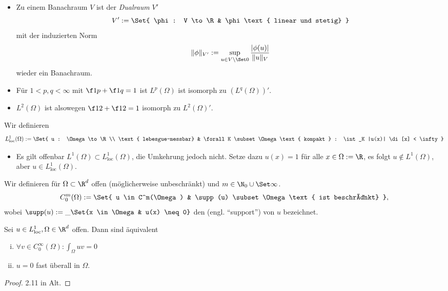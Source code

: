 \begin{df}[$L^p$-Räume]
\begin{note}
\begin{itemize}
			\item
				Zu einem Banachraum $V$ ist der \emph{Dualraum} $V'$
				\[
					V' := \Set{ \phi: V \to \R & \phi \text{ linear und stetig} }
				\]
				mit der induzierten Norm
				\[
					\|\phi\|_{V'} := \sup_{u\in V\setminus \Set 0} \frac{|\phi(u)|}{\|u\|_V}
				\]
				wieder ein Banachraum.
			\item
				Für $1 < p,q < \infty$ mit $\f 1p + \f 1q = 1$ ist $L^p(\Omega)$ ist isomorph zu $(L^q(\Omega))'$.
			\item
				$L^2(\Omega)$ ist alsowegen $\f 12 + \f 12 = 1$ isomorph zu $L^2(\Omega)'$.
		\end{itemize}
	\end{note}
\end{df}

\begin{df} \label{1.5}
	Wir definieren
	\[
		L^1_{\text{loc}}(\Omega) :=
		\Set{ u : \Omega \to \R \\ \text{ lebesgue-messbar} & \forall  K \subset \Omega \text{ kompakt } : \int_K |u(x)| \di[x] < \infty }
	\]
\end{df}

\begin{ex*}
	\begin{itemize}
		\item
			Es gilt offenbar $L^1(\Omega) \subset L^1_{\text{loc}}(\Omega)$,
			die Umkehrung jedoch nicht.
			Setze dazu $u(x) = 1$ für alle $x \in \Omega := \R$,
			es folgt $u \not\in L^1(\Omega)$, aber $u \in L^1_{\text{loc}}(\Omega)$.
	\end{itemize}
\end{ex*}

\begin{df} \label{1.6}
	Wir definieren für $\Omega \subset \R^d$ offen (möglicherweise unbeschränkt) und $m \in \N_0 \cup \Set \infty$.
	\[
		C_0^m(\Omega)
		:= \Set{ u \in C^m(\Omega) & \supp(u) \subset \Omega \text{ ist beschränkt} },
	\]
	wobei $\supp(u) := \_{\Set{x \in \Omega & u(x) \neq 0}}$ den  (engl. “support”) von $u$ bezeichnet.
\end{df}

\begin{st} \label{1.7}
	Sei $u \in L^1_{\text{loc}}, \Omega \in \R^d$ offen. Dann sind äquivalent
	\begin{enumerate}[i)]
		\item
			$\forall v \in C_0^\infty(\Omega) : \int_\Omega uv = 0$
		\item
			$u = 0$ fast überall in $\Omega$.
	\end{enumerate}
	\begin{proof}
		2.11 in Alt.
	\end{proof}
\end{st}

